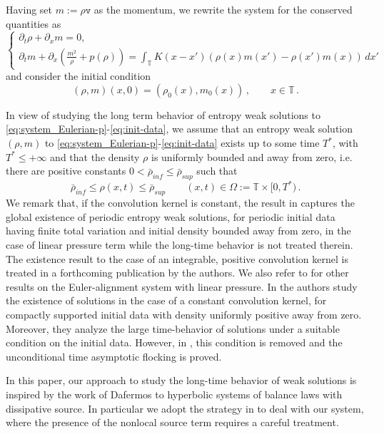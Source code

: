 \documentclass[10pt,reqno]{amsart}
\newcommand{\bbt} {\mathbb T}
\newcommand{\vv}{\mathtt v}
\begin{document}
Having set $m:=\rho\vv$ as the momentum, we rewrite the system for the conserved quantities as
\begin{equation}\label{eq:system_Eulerian-p}
    \begin{cases}
        \partial_t\rho + \partial_x m =0,\\
        \partial_t m + \partial_x \left( \frac{m^2}{\rho} + p(\rho) \right) = \int_\bbt K(x-x')(\rho(x)m(x')-\rho(x')m(x))\,dx'
    \end{cases}
\end{equation}
and consider the initial condition
\begin{equation}\label{eq:init-data}
    (\rho,m)(x,0) = (\rho_0(x),m_0(x))\,,\qquad x\in\bbt\,.
\end{equation}

In view of studying the long term behavior of entropy weak solutions to \eqref{eq:system_Eulerian-p}-\eqref{eq:init-data}, 
we assume that an entropy weak solution $(\rho, m)$ to \eqref{eq:system_Eulerian-p}-\eqref{eq:init-data} exists up to some time $T^*$, with $T^* \leq +\infty$ and that the density $\rho$ is uniformly bounded and away from zero, i.e. there are positive constants $0<\bar\rho_{inf}\le\bar\rho_{sup}$ such that
\begin{equation}\label{eq:bounds-rho}
    \bar\rho_{inf} \leq \rho(x,t) \leq \bar\rho_{sup}\qquad (x,t)\in \Omega:= \bbt\times [0,T^*)\,.
\end{equation}
We remark that, if the convolution kernel is constant, the result in \cite{ACC2024} captures 
the global existence of periodic entropy weak solutions, for periodic initial data having finite total variation and initial density bounded away from zero, in the case of linear pressure term 
while the long-time behavior is not treated therein. 
The %
existence result to the case of an integrable, positive convolution kernel is treated in a forthcoming publication by the authors. We also refer to \cite{AC_2022,AC2024} for other results on the Euler-alignment system with linear pressure. In \cite{AC_2022} the authors study the existence of solutions in the case of a constant convolution kernel, for compactly supported initial data with density uniformly positive away from zero. Moreover, they analyze the large time-behavior of solutions under a suitable condition on the initial data. However, in \cite{AC2024}, this condition is removed and the unconditional time asymptotic flocking is proved. 

In this paper, our approach to study the long-time behavior of weak solutions is inspired by the work of Dafermos to hyperbolic systems of balance laws with dissipative source. In particular we adopt the strategy in \cite[Section 3]{Dafermos_periodic2015} to deal with our system, where the presence of the nonlocal source term requires a careful treatment. 
\end{document}
